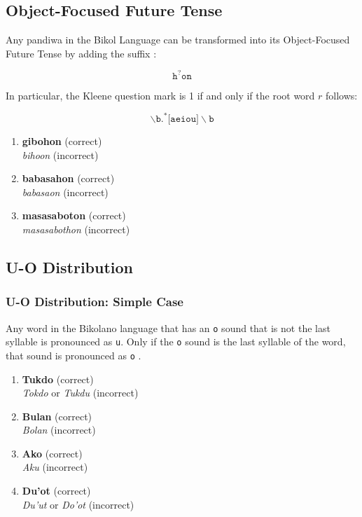 \subsection{Object-Focused Future Tense}
Any pandiwa in the Bikol Language can be transformed into its Object-Focused Future Tense by adding the suffix \cite{bikol_dictionary}:

\[
      \texttt{h}^?\texttt{on}
\]

In particular, the Kleene question mark is 1 if and only if the root word $r$ follows:

\[
      \backslash\texttt{b.}^*\texttt{[aeiou]}\backslash\texttt{b}
\]

\begin{example}
\end{example}

\begin{enumerate}
      \item \textbf{gibohon} (correct) \\
            \textit{bihoon} (incorrect)
      \item \textbf{babasahon} (correct) \\
            \textit{babasaon} (incorrect)
      \item \textbf{masasaboton} (correct) \\
            \textit{masasabothon} (incorrect)
\end{enumerate}

\subsection{U-O Distribution}
\label{uo_distribution}
\subsubsection{U-O Distribution: Simple Case}
Any word in the Bikolano language that has an \texttt{o} sound that is not the last syllable is pronounced as \texttt{u}. Only if the \texttt{o} sound is the last syllable of the word, that sound is pronounced as \texttt{o} \cite{bikol_dictionary}.

\begin{example}
\end{example}

\begin{enumerate}
      \item \textbf{Tukdo} (correct) \\
            \textit{Tokdo} or \textit{Tukdu} (incorrect) 
      \item \textbf{Bulan} (correct) \\
            \textit{Bolan} (incorrect) 
      \item \textbf{Ako} (correct) \\
            \textit{Aku} (incorrect) 
      \item \textbf{Du'ot} (correct) \\
            \textit{Du'ut} or \textit{Do'ot} (incorrect) 
\end{enumerate}

